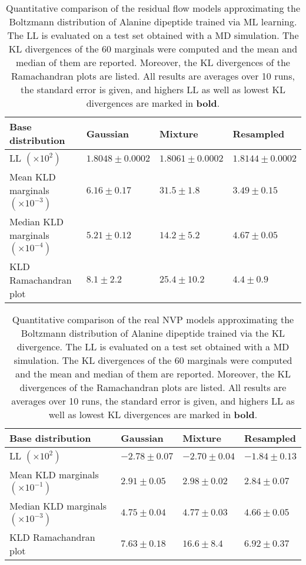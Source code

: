 \documentclass[twoside]{article}
\begin{document}
\begin{table}[h]
  \caption{Quantitative comparison of the residual flow models approximating the Boltzmann distribution of Alanine dipeptide trained via ML learning. The LL is evaluated on a test set obtained with a MD simulation. The KL divergences of the 60 marginals were computed and the mean and median of them are reported. Moreover, the KL divergences of the Ramachandran plots are listed. All results are averages over 10 runs, the standard error is given, and highers LL as well as lowest KL divergences are marked in \textbf{bold}.}
  \label{tab:aldp_kld_fkld_resflow}
  \centering
  \vspace{0.3cm}
  \begin{tabular}{l|lll}
    Base distribution & Gaussian & Mixture & Resampled \\
    \hline
    LL $(\times 10^2)$ & $1.8048\pm0.0002$ & $1.8061\pm0.0002$ & $\mathbf{1.8144\pm0.0002}$ \\
    Mean KLD marginals $(\times 10^{-3})$ & $6.16\pm0.17$ & $31.5\pm1.8$ & $\mathbf{3.49\pm0.15}$ \\
    Median KLD marginals $(\times 10^{-4})$ & $5.21\pm0.12$ & $14.2\pm5.2$ & $\mathbf{4.67\pm0.05}$ \\
    KLD Ramachandran plot & $8.1\pm2.2$ & $25.4\pm10.2$ & $\mathbf{4.4\pm0.9}$
  \end{tabular}
\end{table}

\begin{table}[h]
  \caption{Quantitative comparison of the real NVP models approximating the Boltzmann distribution of Alanine dipeptide trained via the KL divergence. The LL is evaluated on a test set obtained with a MD simulation. The KL divergences of the 60 marginals were computed and the mean and median of them are reported. Moreover, the KL divergences of the Ramachandran plots are listed. All results are averages over 10 runs, the standard error is given, and highers LL as well as lowest KL divergences are marked in \textbf{bold}.}
  \label{tab:aldp_kld_rnvp_rkld}
  \centering
  \vspace{0.3cm}
  \begin{tabular}{l|lll}
    Base distribution & Gaussian & Mixture & Resampled \\
    \hline
    LL $(\times 10^2)$ & $-2.78\pm0.07$ & $-2.70\pm0.04$ & $\mathbf{-1.84\pm0.13}$ \\
    Mean KLD marginals $(\times 10^{-1})$ & $2.91\pm0.05$ & $2.98\pm0.02$ & $\mathbf{2.84\pm0.07}$ \\
    Median KLD marginals $(\times 10^{-3})$ & $4.75\pm0.04$ & $4.77\pm0.03$ & $\mathbf{4.66\pm0.05}$ \\
    KLD Ramachandran plot & $7.63\pm0.18$ & $16.6\pm8.4$ & $\mathbf{6.92\pm0.37}$
  \end{tabular}
\end{table}
\end{document}

